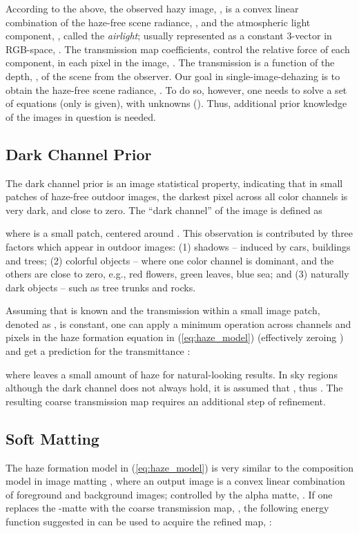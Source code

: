 \documentclass[10pt,twocolumn,twoside]{IEEEtran}
\begin{document}
According to the above, the observed hazy image, , is a convex linear combination of the haze-free scene radiance, , and the atmospheric light component, , called the \textit{airlight}; usually represented as a constant 3-vector in RGB-space, . The transmission map coefficients,  control the relative force of each component, in each pixel in the image, . The transmission is a function of the depth, , of the scene from the observer. Our goal in single-image-dehazing is to obtain the haze-free scene radiance, . To do so, however, one needs to solve a set of  equations (only  is given), with  unknowns (). Thus, additional prior knowledge of the images in question is needed.

\subsection{Dark Channel Prior}\label{dark_channel}

The dark channel prior is an image statistical property, indicating that in small patches of haze-free outdoor images, the darkest pixel across all color channels is very dark, and close to zero. The ``dark channel'' of the image is defined as

where  is a small patch, centered around . This observation is contributed by three factors which appear in outdoor images: (1) shadows -- induced by cars, buildings and trees; (2) colorful objects -- where one color channel is dominant, and the others are close to zero, e.g., red flowers, green leaves, blue sea; and (3) naturally dark objects -- such as tree trunks and rocks.

Assuming that  is known and the transmission within a small image patch, denoted as , is constant, one can apply a minimum operation across channels and pixels in the haze formation equation in (\ref{eq:haze_model}) (effectively zeroing ) and get a prediction for the transmittance \cite{DCP}:

where  leaves a small amount of haze for natural-looking results. In sky regions although the dark channel does not always hold, it is assumed that , thus . The resulting coarse transmission map requires an additional step of refinement.

\subsection{Soft Matting}\label{soft_matting}

The haze formation model in (\ref{eq:haze_model}) is very similar to the composition model in image matting \cite{soft_matting}, where an output image is a convex linear combination of foreground and background images; controlled by the alpha matte, . If one replaces the -matte with the coarse transmission map, , the following energy function suggested in \cite{soft_matting} can be used to acquire the refined map, :
\end{document}
